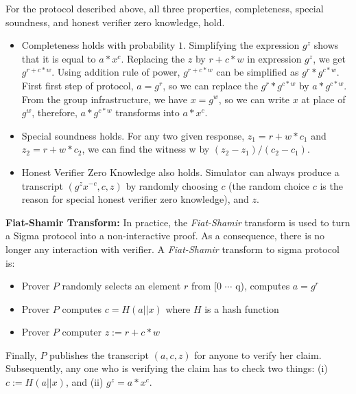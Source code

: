 \begin{enumerate}
{     For the protocol described above, all three properties, completeness, special soundness, and honest 
     verifier zero knowledge, hold. 
     \begin{itemize}
      \item Completeness holds with probability $1$. Simplifying the expression $g^{z}$ shows that 
      it is equal to $a * x^{c}$. Replacing the $z$ by $r + c * w$ in expression  $g^{z}$, we get 
      $g^{r + c * w}$.  Using addition rule of power, $g^{r + c * w}$ can be simplified as 
      $g^{r} * g^{c * w}$. First first step of protocol, $a = g^r$, so we can replace the $g^{r} * g^{c * w}$ 
      by $a * g^{c * w}$. From the group infrastructure, we have $x = g^w$, so we can write $x$ at place of 
      $g^{w}$, therefore, $a * g^{c * w}$ transforms into $a * x^c$. 
      
     \item Special soundness holds. For any two given response, 
     $z_{1} = r + w * c_{1}$ and  $z_{2} = r + w * c_{2}$, we can find the witness w by  $(z_{2} - z_{1})/(c_{2} - c_{1})$.
     
     \item Honest Verifier Zero Knowledge also holds. Simulator can always produce a transcript $(g^{z} x^{-c}, c, z)$ by randomly 
     choosing $c$ (the random choice $c$ is the reason for special honest verifier zero knowledge), and $z$. 
     \end{itemize}
     
     \textbf{Fiat-Shamir Transform:}
      In practice, the \textit{Fiat-Shamir} transform is used to turn a Sigma protocol into a non-interactive proof. 
      As a consequence, there is no longer any interaction with verifier. A \textit{Fiat-Shamir}  transform to sigma protocol is:
      
      \begin{itemize}
     \item Prover $P$ randomly selects an element $r$ from [0 $\dotsb$ q), computes $a = g^r$
     \item Prover $P$ computes $c =  H(a || x) $ where $H$ is a hash function
     \item Prover $P$ computer $z := r + c  * w $
     \end{itemize}
      Finally, $P$ publishes the transcript $(a, c, z)$ for anyone to verify her claim. Subsequently, 
      any one who is verifying the claim has to check two things: (i) $c := H (a || x)$, and (ii) 
      $g^{z} = a * x^{c}$. 
      
}
\end{enumerate}
